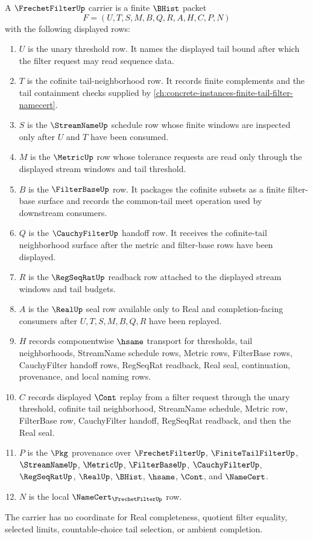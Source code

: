 \begin{definition}
\label{def:frechet-filter-carrier}
A $\FrechetFilterUp$ carrier is a finite $\BHist$ packet
$$
F=(U,T,S,M,B,Q,R,A,H,C,P,N)
$$
with the following displayed rows:
\begin{enumerate}
\item $U$ is the unary threshold row. It names the displayed tail bound after which the filter request may read sequence data.
\item $T$ is the cofinite tail-neighborhood row. It records finite complements and the tail containment checks supplied by \autoref{ch:concrete-instances-finite-tail-filter-namecert}.
\item $S$ is the $\StreamNameUp$ schedule row whose finite windows are inspected only after $U$ and $T$ have been consumed.
\item $M$ is the $\MetricUp$ row whose tolerance requests are read only through the displayed stream windows and tail threshold.
\item $B$ is the $\FilterBaseUp$ row. It packages the cofinite subsets as a finite filter-base surface and records the common-tail meet operation used by downstream consumers.
\item $Q$ is the $\CauchyFilterUp$ handoff row. It receives the cofinite-tail neighborhood surface after the metric and filter-base rows have been displayed.
\item $R$ is the $\RegSeqRatUp$ readback row attached to the displayed stream windows and tail budgets.
\item $A$ is the $\RealUp$ seal row available only to Real and completion-facing consumers after $U,T,S,M,B,Q,R$ have been replayed.
\item $H$ records componentwise $\hsame$ transport for thresholds, tail neighborhoods, StreamName schedule rows, Metric rows, FilterBase rows, CauchyFilter handoff rows, RegSeqRat readback, Real seal, continuation, provenance, and local naming rows.
\item $C$ records displayed $\Cont$ replay from a filter request through the unary threshold, cofinite tail neighborhood, StreamName schedule, Metric row, FilterBase row, CauchyFilter handoff, RegSeqRat readback, and then the Real seal.
\item $P$ is the $\Pkg$ provenance over $\FrechetFilterUp$, $\FiniteTailFilterUp$, $\StreamNameUp$, $\MetricUp$, $\FilterBaseUp$, $\CauchyFilterUp$, $\RegSeqRatUp$, $\RealUp$, $\BHist$, $\hsame$, $\Cont$, and $\NameCert$.
\item $N$ is the local $\NameCert_{\FrechetFilterUp}$ row.
\end{enumerate}
The carrier has no coordinate for Real completeness, quotient filter equality, selected limits, countable-choice tail selection, or ambient completion.
\end{definition}

